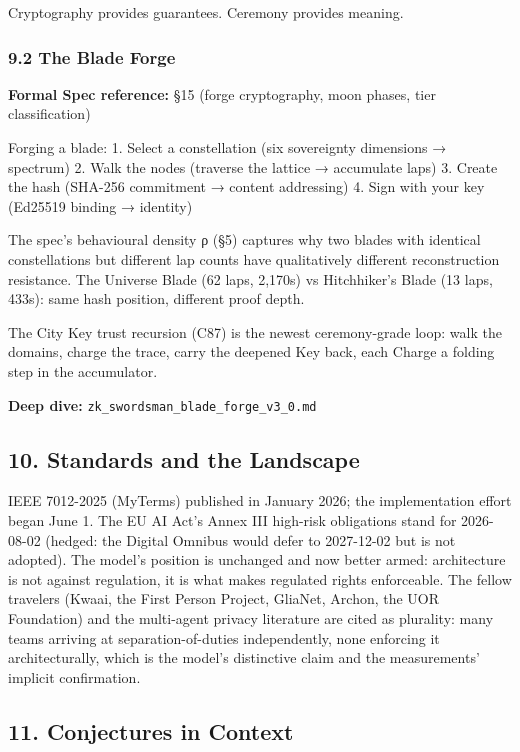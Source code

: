 \documentclass[
  11pt,
]{article}
\newcounter{none} %
\begin{document}
Cryptography provides guarantees. Ceremony provides meaning.

\subsubsection{9.2 The Blade Forge}\label{the-blade-forge}

\textbf{Formal Spec reference:} §15 (forge cryptography, moon phases,
tier classification)

Forging a blade: 1. Select a constellation (six sovereignty dimensions →
spectrum) 2. Walk the nodes (traverse the lattice → accumulate laps) 3.
Create the hash (SHA-256 commitment → content addressing) 4. Sign with
your key (Ed25519 binding → identity)

The spec's behavioural density ρ (§5) captures why two blades with
identical constellations but different lap counts have qualitatively
different reconstruction resistance. The Universe Blade (62 laps,
2,170s) vs Hitchhiker's Blade (13 laps, 433s): same hash position,
different proof depth.

The City Key trust recursion (C87) is the newest ceremony-grade loop:
walk the domains, charge the trace, carry the deepened Key back, each
Charge a folding step in the accumulator.

\textbf{Deep dive:} \texttt{zk\_swordsman\_blade\_forge\_v3\_0.md}

\subsection{10. Standards and the
Landscape}\label{standards-and-the-landscape}

IEEE 7012-2025 (MyTerms) published in January 2026; the implementation
effort began June 1. The EU AI Act's Annex III high-risk obligations
stand for 2026-08-02 (hedged: the Digital Omnibus would defer to
2027-12-02 but is not adopted). The model's position is unchanged and
now better armed: architecture is not against regulation, it is what
makes regulated rights enforceable. The fellow travelers (Kwaai, the
First Person Project, GliaNet, Archon, the UOR Foundation) and the
multi-agent privacy literature are cited as plurality: many teams
arriving at separation-of-duties independently, none enforcing it
architecturally, which is the model's distinctive claim and the
measurements' implicit confirmation.

\subsection{11. Conjectures in Context}\label{conjectures-in-context}
\end{document}
